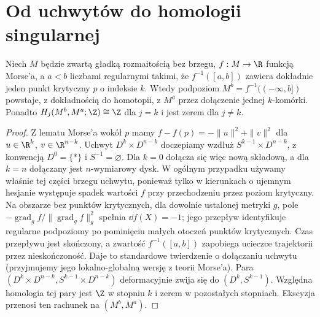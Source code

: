 \section{Od uchwytów do homologii singularnej}
\begin{twierdzenie}
\label{thm:morse-handle-v10}
Niech $M$ będzie zwartą gładką rozmaitością bez brzegu,
$f:M\to\R$ funkcją Morse'a, a $a<b$ liczbami regularnymi
takimi, że $f^{-1}([a,b])$ zawiera dokładnie jeden punkt
krytyczny $p$ o indeksie $k$.
Wtedy podpoziom $M^b=f^{-1}(( -\infty,b])$ powstaje,
z dokładnością do homotopii, z $M^a$ przez dołączenie
jednej $k$-komórki. Ponadto
$H_j(M^b,M^a;\Z)\cong\Z$ dla $j=k$ i jest zerem
dla $j\ne k$.
\end{twierdzenie}
\begin{proof}
Z lematu Morse'a wokół $p$ mamy $f-f(p)=-\|u\|^2+\|v\|^2$
dla $u\in\R^k$, $v\in\R^{n-k}$. Uchwyt
$D^k\times D^{n-k}$ doczepiamy wzdłuż
$S^{k-1}\times D^{n-k}$, z konwencją
$D^0=\{*\}$ i $S^{-1}=\varnothing$.
Dla $k=0$ dołącza się więc nową składową, a
dla $k=n$ dołączany jest $n$-wymiarowy dysk.
W ogólnym przypadku używamy właśnie tej
części brzegu uchwytu, ponieważ tylko w kierunkach
o ujemnym hesjanie
występuje spadek wartości $f$ przy przechodzeniu
przez poziom krytyczny. Na obszarze bez punktów krytycznych, dla dowolnie ustalonej
metryki $g$, pole $-\operatorname{grad}_g f/\|\operatorname{grad}_g f\|_g^2$
spełnia $\dd f(X)=-1$; jego przepływ identyfikuje regularne
podpoziomy po pominięciu małych otoczeń punktów krytycznych.
Czas przepływu jest skończony, a zwartość $f^{-1}([a,b])$
zapobiega ucieczce trajektorii przez nieskończoność.
Daje to standardowe twierdzenie o dołączaniu uchwytu
(przyjmujemy jego lokalno-globalną wersję z teorii Morse'a).
Para $(D^k\times D^{n-k},S^{k-1}\times D^{n-k})$
deformacyjnie zwija się do $(D^k,S^{k-1})$.
Względna homologia tej pary jest $\Z$ w stopniu $k$
i zerem w pozostałych stopniach. Ekscyzja przenosi
ten rachunek na $(M^b,M^a)$.
\end{proof}

